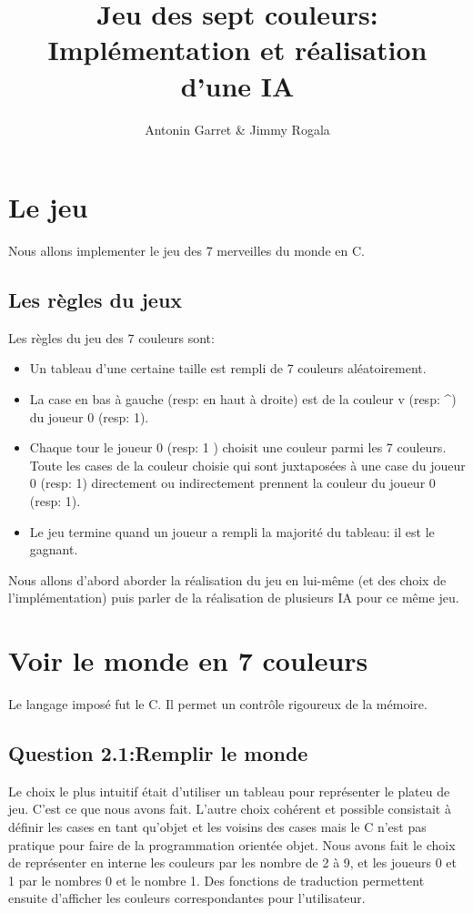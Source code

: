 \documentclass[11pt]{article}
\title{Jeu des sept couleurs: Implémentation et réalisation d'une IA}
\author{Antonin Garret & Jimmy Rogala}
\begin{document}

\section{Le jeu}
Nous allons implementer le jeu des 7 merveilles du monde en C.

  \subsection{Les règles du jeux}
    Les règles du jeu des 7 couleurs sont:
    \begin{itemize} %
      \item Un tableau d'une certaine taille est rempli de 7 couleurs aléatoirement.
      \item La case en bas à gauche (resp: en haut à droite) est de la couleur v (resp: \textasciicircum ) du joueur 0 (resp: 1).
      \item Chaque tour le joueur 0 (resp: 1 ) choisit une couleur parmi les 7 couleurs. Toute les cases de la couleur choisie qui sont juxtaposées à une case du joueur 0 (resp: 1) directement ou indirectement prennent la couleur du joueur 0 (resp: 1).
      \item Le jeu termine quand un joueur a rempli la majorité du tableau: il est le gagnant.
    \end{itemize}

    Nous allons d'abord aborder la réalisation du jeu en lui-même (et des choix de l'implémentation) puis parler de la réalisation de plusieurs IA pour ce même jeu.


\section{Voir le monde en 7 couleurs}
    Le langage imposé fut le C. Il permet un contrôle rigoureux de la mémoire.
    \subsection{Question 2.1:Remplir le monde}
      Le choix le plus intuitif était d'utiliser un tableau pour représenter le plateu de jeu. C'est ce que nous avons fait. L'autre choix cohérent et possible consistait à définir les cases en tant qu'objet et les voisins des cases mais le C n'est pas pratique pour faire de la programmation orientée objet.
      Nous avons fait le choix de représenter en interne les couleurs par les nombre de 2 à 9, et les joueurs 0 et 1 par le nombres 0 et le nombre 1. Des fonctions de traduction permettent ensuite d'afficher les couleurs correspondantes pour l'utilisateur.
\end{document}
